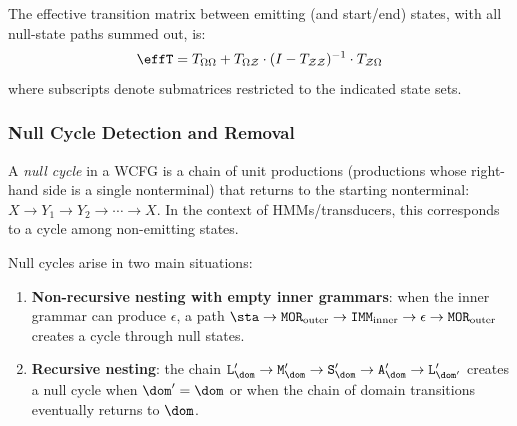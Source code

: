\begin{proposition}
The effective transition matrix between emitting (and start/end) states,
with all null-state paths summed out, is:
\begin{equation}
\effT = T_{\Omega\Omega}
+ T_{\Omega\mathcal{Z}} \cdot (I - T_{\mathcal{Z}\mathcal{Z}})^{-1}
\cdot T_{\mathcal{Z}\Omega}
\end{equation}
where subscripts denote submatrices restricted to the indicated
state sets.
\end{proposition}


\subsubsection{Null Cycle Detection and Removal}
\label{sec:null-cycles-appendix}

\begin{definition}
A \emph{null cycle} in a WCFG is a chain of unit productions
(productions whose right-hand side is a single nonterminal)
that returns to the starting nonterminal:
$X \to Y_1 \to Y_2 \to \cdots \to X$.
In the context of HMMs/transducers, this corresponds to a
cycle among non-emitting states.
\end{definition}

Null cycles arise in two main situations:
\begin{enumerate}
\item \textbf{Non-recursive nesting with empty inner grammars}:
  when the inner grammar can produce $\epsilon$, a path
  $\sta \to \texttt{MOR}_{\mathrm{outer}} \to
  \texttt{IMM}_{\mathrm{inner}} \to \epsilon \to
  \texttt{MOR}_{\mathrm{outer}}$ creates a cycle
  through null states.
\item \textbf{Recursive nesting}: the chain
  $\texttt{L}'_\dom \to \texttt{M}'_\dom \to \texttt{S}'_\dom
  \to \texttt{A}'_\dom \to \texttt{L}'_{\dom'}$ creates a
  null cycle when $\dom' = \dom$ or when the chain of domain
  transitions eventually returns to $\dom$.
\end{enumerate}

